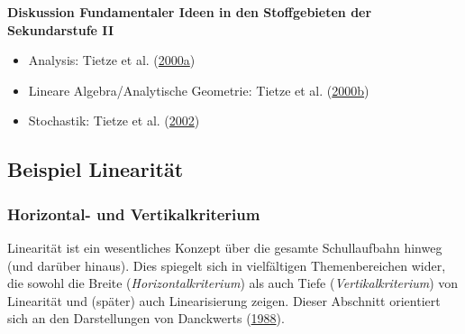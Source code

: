 \documentclass[
]{scrbook}
\providecommand{\tightlist}{%
  \setlength{\itemsep}{0pt}\setlength{\parskip}{0pt}}
\renewenvironment{quote}{
  \list{}{
	\leftmargin0.2cm   %
    \rightmargin\leftmargin
      	\def\FrameCommand
    {%
        {\color{quoteColor}\vrule width 2pt}%
        \hspace{0pt}%
    }%
    \MakeFramed{\advance \hsize -\width \FrameRestore}    \color{quoteColor}
    }
  \item\relax
}
{\endlist\color{black}\endMakeFramed}
\theoremstyle{definition}
\theoremstyle{definition}
\theoremstyle{definition}
\theoremstyle{definition}
\theoremstyle{remark}
\begin{document}
\begin{quote}
\textbf{Diskussion Fundamentaler Ideen in den Stoffgebieten der Sekundarstufe II}

\begin{itemize}
\tightlist
\item
  Analysis: Tietze et al. (\protect\hyperlink{ref-Tietze:2000a}{2000a})
\item
  Lineare Algebra/Analytische Geometrie: Tietze et al. (\protect\hyperlink{ref-Tietze:2000}{2000b})
\item
  Stochastik: Tietze et al. (\protect\hyperlink{ref-Tietze:2002}{2002})
\end{itemize}
\end{quote}

\hypertarget{beispiel-linearitaet}{%
\subsection{Beispiel Linearität}\label{beispiel-linearitaet}}

\hypertarget{horizontal--und-vertikalkriterium}{%
\subsubsection{Horizontal- und Vertikalkriterium}\label{horizontal--und-vertikalkriterium}}

Linearität ist ein wesentliches Konzept über die gesamte Schullaufbahn hinweg (und darüber hinaus). Dies spiegelt sich in vielfältigen Themenbereichen wider, die sowohl die Breite (\emph{Horizontalkriterium}) als auch Tiefe (\emph{Vertikalkriterium}) von Linearität und (später) auch Linearisierung zeigen. Dieser Abschnitt orientiert sich an den Darstellungen von Danckwerts (\protect\hyperlink{ref-Danckwerts:1988}{1988}).
\end{document}
